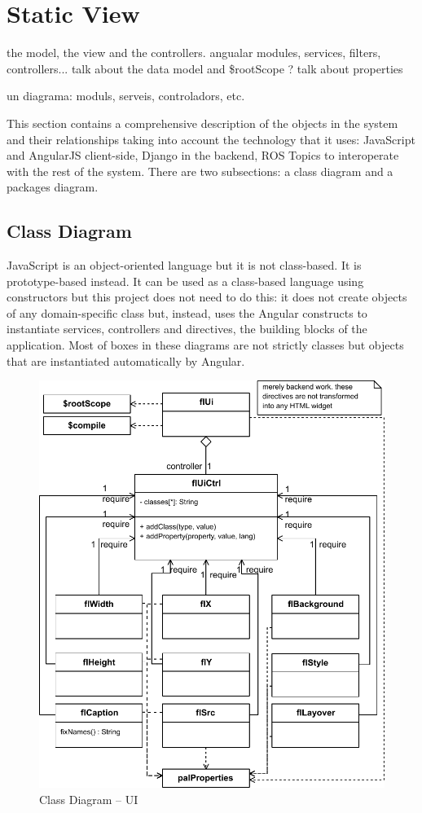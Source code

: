 \FloatBarrier

\section{Static View}
the model, the view and the controllers. angualar modules, services, filters, controllers...
talk about the data model and \$rootScope ? talk about properties

un diagrama:
moduls, serveis, controladors, etc. 

This section contains a comprehensive description of the objects in the system and their relationships taking into account the technology that it uses: JavaScript and AngularJS client-side, Django in the backend, \ac{ROS} Topics to interoperate with the rest of the system.
There are two subsections: a class diagram and a packages diagram.

\subsection{Class Diagram}
JavaScript is an object-oriented language but it is not class-based.
It is prototype-based instead.
It can be used as a class-based language using constructors but this project does not need to do this: it does not create objects of any domain-specific class but, instead, uses the Angular constructs to instantiate services, controllers and directives, the building blocks of the application.
Most of boxes in these diagrams are not strictly classes but objects that are instantiated automatically by Angular.

\begin{figure}[htb]
    \centering
    \includegraphics{figures/design-class-ui.pdf}
    \caption{Class Diagram -- UI}
    \label{fig:class-ui}
\end{figure}

